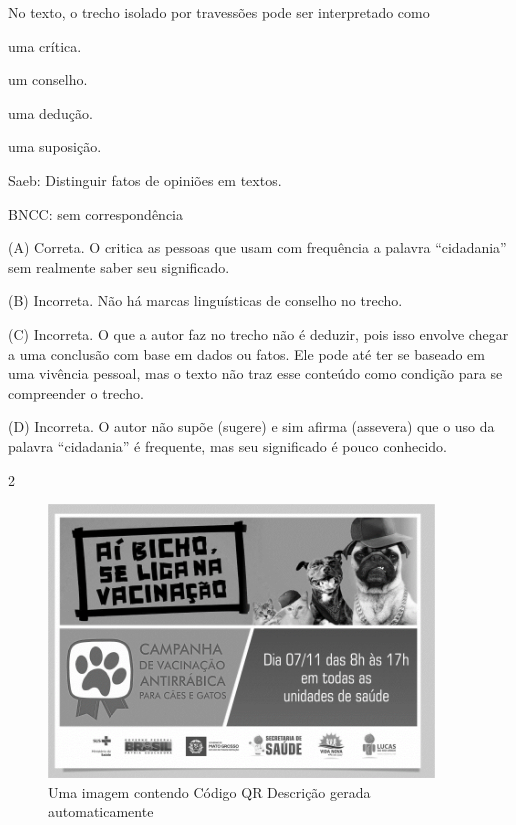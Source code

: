 
No texto, o trecho isolado por travessões pode ser interpretado como

\begin{escolha}
\item uma crítica.

\item um conselho.

\item uma dedução.

\item uma suposição.
\end{escolha}

Saeb: Distinguir fatos de opiniões em textos.

BNCC: sem correspondência

(A) Correta. O critica as pessoas que usam com frequência a palavra
``cidadania'' sem realmente saber seu significado.

(B) Incorreta. Não há marcas linguísticas de conselho no trecho.

(C) Incorreta. O que a autor faz no trecho não é deduzir, pois isso
envolve chegar a uma conclusão com base em dados ou fatos. Ele pode até
ter se baseado em uma vivência pessoal, mas o texto não traz esse
conteúdo como condição para se compreender o trecho.

(D) Incorreta. O autor não supõe (sugere) e sim afirma (assevera) que o
uso da palavra ``cidadania'' é frequente, mas seu significado é pouco
conhecido.

\num{2}

\begin{figure}
\centering
\includegraphics[width=4.03125in,height=2.85231in]{./imgSAEB_8_POR/media/image28.png}
\caption{Uma imagem contendo Código QR Descrição gerada automaticamente}
\end{figure}

